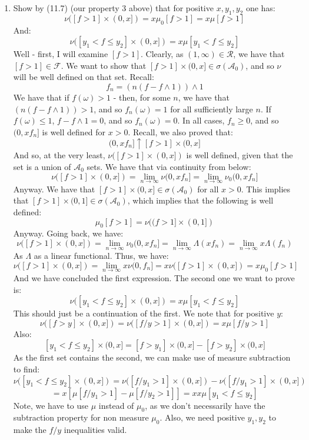 \documentclass[12pt,a4paper]{article}
\newcommand{\1}[1]{\mathbbm{1}\left\{ #1 \right\}}
\newcommand{\acal}{\mathcal{A}}
\newcommand{\fcal}{\mathcal{F}}
\newcommand{\rcal}{\mathcal{R}}
\begin{document}
\begin{enumerate}
	\item Show by (11.7) (our property 3 above) that for positive $x,y_1,y_2$ one has:
	$$
		\nu([f > 1] \times (0,x]) =
		x\mu_0[f > 1] = x\mu[f > 1]
	$$
	And:
	$$
		\nu([y_1 < f \leq y_2] \times (0,x]) = x\mu[y_1 < f \leq y_2]
	$$
	Well - first, I will examine $[f > 1]$. Clearly, as $(1, \infty) \in \rcal$, we have that $[f > 1] \in \fcal$. We want to show that $[f > 1] \times (0,x] \in \sigma(\acal_0)$, and so $\nu$ will be well defined on that set. Recall:
	$$
		f_n = (n(f - f \wedge 1)) \wedge 1
	$$
	We have that if $f(\omega) > 1$ - then, for some $n$, we have that $(n(f - f \wedge 1)) > 1$, and so $f_n(\omega) = 1$ for all sufficiently large $n$. If $f(\omega) \leq 1$, $f - f \wedge 1 = 0$, and so $f_n(\omega) = 0$. In all cases, $f_n \geq 0$, and so $(0, xf_n]$ is well defined for $x > 0$. Recall, we also proved that:
	$$
		(0,xf_n] \uparrow [f > 1] \times (0,x]
	$$ 
	And so, at the very least, $\nu([f > 1] \times (0,x])$ is well defined, given that the set is a union of $\acal_0$ sets. We have that via continuity from below:
	$$
		\nu([f > 1] \times (0,x]) = \lim_{n \to \infty} \nu(0,xf_n] =
		\lim_{n \to \infty} \nu_0(0,xf_n]
	$$
	Anyway. We have that $[f > 1] \times (0,x] \in \sigma(\acal_0)$ for all $x > 0$. This implies that $[f > 1] \times (0,1] \in \sigma(\acal_0)$, which implies that the following is well defined:
	$$
		\mu_0[f>1] = \nu((f > 1] \times (0,1])
	$$
	Anyway. Going back, we have:
	$$
		\nu([f > 1] \times (0,x]) =
		\lim_{n \to \infty} \nu_0(0,xf_n] =
		\lim_{n \to \infty} \Lambda(xf_n) =
		\lim_{n \to \infty} x\Lambda(f_n)
	$$
	As $\Lambda$ as a linear functional. Thus, we have:
	$$
		\nu([f > 1] \times (0,x]) = \lim_{n \to \infty} x\nu(0,f_n] = x\nu([f > 1] \times (0,x]) =
		x\mu_0[f>1]
	$$
	And we have concluded the first expression. The second one we want to prove is:
	$$
		\nu([y_1 < f \leq y_2] \times (0,x]) = x\mu[y_1 < f \leq y_2]
	$$
	This should just be a continuation of the first. We note that for positive $y$:
	$$
		\nu([f > y] \times (0,x]) =
		\nu([f/y > 1] \times (0,x]) =
		x\mu[f/y > 1]
	$$
	Also:
	$$
		[y_1 < f \leq y_2] \times (0,x] =
		[f > y_1] \times (0,x] - [f > y_2] \times (0,x]
	$$
	As the first set contains the second, we can make use of measure subtraction to find:
	$$
		\nu([y_1 < f \leq y_2] \times (0,x]) =
		\nu([f/y_1 > 1] \times (0,x]) -
		\nu([f/y_1 > 1] \times (0,x])
	$$
	$$
		=
		x\left[\mu[f/y_1 > 1] - \mu[f/y_2 > 1]\right] =
		xx\mu[y_1 < f \leq y_2]
	$$
	Note, we have to use $\mu$ instead of $\mu_0$, as we don't necessarily have the subtraction property for non measure $\mu_0$. Also, we need positive $y_1,y_2$ to make the $f/y$ inequalities valid.
	

\end{enumerate}
\end{document}
